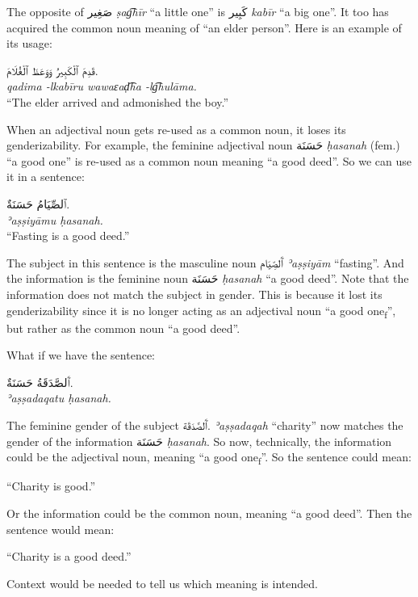 \documentclass[
  10pt,
]{book}
\begin{document}
The opposite of
\foreignlanguage{arabic}{صَغِير} \emph{ṣag͡hīr} \enquote{a little one}
is \foreignlanguage{arabic}{کَبِير} \emph{kabīr} \enquote{a big one}. It too has acquired the common noun meaning of \enquote{an elder person}. Here is an example of its usage:

\foreignlanguage{arabic}{قَدِمَ ٱلْکَبِيرُ وَوَعَظَ ٱلْغُلَامَ.}\\
\emph{qadima -lkabīru wawaɛaḍ͡ha -lg͡hulāma.}\\
\enquote{The elder arrived and admonished the boy.}

When an adjectival noun gets re-used as a common noun, it loses its genderizability.
For example, the feminine adjectival noun \foreignlanguage{arabic}{حَسَنَة} \emph{ḥasanah} (fem.) \enquote{a good one} is re-used as a common noun meaning \enquote{a good deed}. So we can use it in a sentence:

\foreignlanguage{arabic}{ٱلصِّيَامُ حَسَنَةٌ.}\\
\emph{ʾaṣṣiyāmu ḥasanah.}\\
\enquote{Fasting is a good deed.}

The subject in this sentence is the masculine noun \foreignlanguage{arabic}{ٱَلصِّيَام} \emph{ʾaṣṣiyām} \enquote{fasting}.
And the information is the feminine noun \foreignlanguage{arabic}{حَسَنَة} \emph{ḥasanah} \enquote{a good deed}.
Note that the information does not match the subject in gender. This is because it lost its genderizability since it is no longer acting as an adjectival noun \enquote{a good one\textsubscript{f}}, but rather as the common noun \enquote{a good deed}.

What if we have the sentence:

\foreignlanguage{arabic}{ٱَلصَّدَقَةُ حَسَنَةٌ.}\\
\emph{ʾaṣṣadaqatu ḥasanah.}

The feminine gender of the subject
\foreignlanguage{arabic}{ٱَلصَّدَقَة.}
\emph{ʾaṣṣadaqah} \enquote{charity} now matches the gender of the information
\foreignlanguage{arabic}{حَسَنَة} \emph{ḥasanah}.
So now, technically, the information could be the adjectival noun, meaning \enquote{a good one\textsubscript{f}}. So the sentence could mean:

\enquote{Charity is good.}

Or the information could be the common noun, meaning \enquote{a good deed}. Then the sentence would mean:

\enquote{Charity is a good deed.}

Context would be needed to tell us which meaning is intended.
\end{document}
